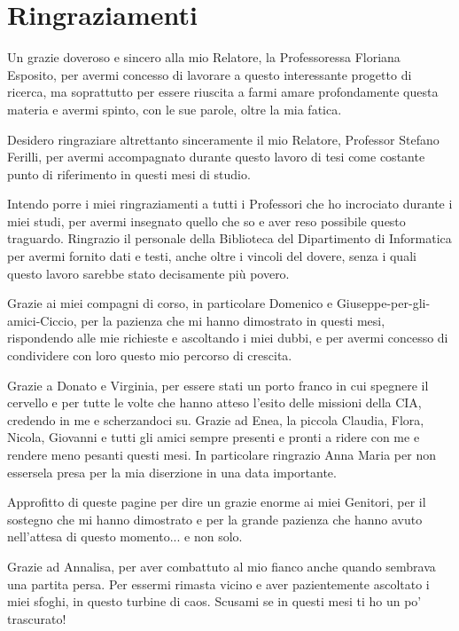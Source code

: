 \chapter*{Ringraziamenti}
\rhead{}

Un grazie doveroso e sincero alla mio Relatore, la Professoressa Floriana Esposito, per avermi concesso di lavorare a questo interessante progetto di ricerca, ma soprattutto per essere riuscita a farmi amare profondamente questa materia e avermi spinto, con le sue parole, oltre la mia fatica. 

Desidero ringraziare altrettanto sinceramente il mio Relatore, Professor Stefano Ferilli, per avermi accompagnato durante questo lavoro di tesi come costante punto di riferimento in questi mesi di studio.

Intendo porre i miei ringraziamenti a tutti i Professori che ho incrociato durante i miei studi, per avermi insegnato quello che so e aver reso possibile questo traguardo. Ringrazio il personale della Biblioteca del Dipartimento di Informatica per avermi fornito dati e testi, anche oltre i vincoli del dovere, senza i quali questo lavoro sarebbe stato decisamente più povero.

Grazie ai miei compagni di corso, in particolare Domenico e Giuseppe-per-gli-amici-Ciccio, per la pazienza che mi hanno dimostrato in questi mesi, rispondendo alle mie richieste e ascoltando i miei dubbi, e per avermi concesso di condividere con loro questo mio percorso di crescita.

Grazie a Donato e Virginia, per essere stati un porto franco in cui spegnere il cervello e per tutte le volte che hanno atteso l'esito delle missioni della CIA, credendo in me e scherzandoci su. Grazie ad Enea, la piccola Claudia, Flora, Nicola, Giovanni e tutti gli amici sempre presenti e pronti a ridere con me e rendere meno pesanti questi mesi. In particolare ringrazio Anna Maria per non essersela presa per la mia diserzione in una data importante.

Approfitto di queste pagine per dire un grazie enorme ai miei Genitori, per il sostegno che mi hanno dimostrato e per la grande pazienza che hanno avuto nell'attesa di questo momento... e non solo.

Grazie ad Annalisa, per aver combattuto al mio fianco anche quando sembrava una partita persa. Per essermi rimasta vicino e aver pazientemente ascoltato i miei sfoghi, in questo turbine di caos. Scusami se in questi mesi ti ho un po' trascurato!

